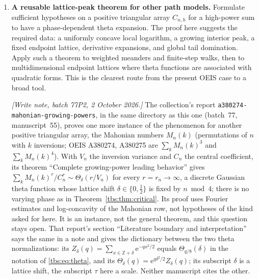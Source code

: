 \documentclass[11pt,a4paper]{article}
\numberwithin{equation}{section}
\theoremstyle{definition}
\newcommand{\Z}{\mathbb Z}
\newcommand{\ee}{\mathrm e}
\newcommand{\code}[1]{\texttt{#1}}
\begin{document}
\begin{enumerate}[leftmargin=*,label=\textbf{Q\arabic*.}]
\item \textbf{A reusable lattice-peak theorem for other path models.}
Formulate sufficient hypotheses on a positive triangular array
$C_{n,h}$ for a high-power sum to have a phase-dependent theta expansion.
The proof here suggests the required data: a uniformly concave local
logarithm, a growing interior peak, a fixed endpoint lattice, derivative
expansions, and global tail domination. Apply such a theorem to weighted
meanders and finite-step walks, then to multidimensional endpoint
lattices where theta functions are associated with quadratic forms.
This is the clearest route from the present OEIS case to a broad tool.

\emph{[Write note, batch 77P2, 2 October 2026.]} The collection's report
\code{a380274-\allowbreak mahonian-\allowbreak growing-\allowbreak powers}, in the same directory as this
one (batch~77, manuscript~55), proves one more instance of the phenomenon
for another positive triangular array, the Mahonian numbers $M_n(k)$
(permutations of $n$ with $k$ inversions; OEIS A380274, A380275 are
$\sum_k M_n(k)^3$ and $\sum_k M_n(k)^4$). With $V_n$ the inversion
variance and $C_n$ the central coefficient, its theorem ``Complete
growing-power leading behavior'' gives
$\sum_k M_n(k)^{r}/C_n^{r}\sim\Theta_\delta(r/V_n)$ for every $r=r_n\to\infty$,
a discrete Gaussian theta function whose lattice shift
$\delta\in\{0,\tfrac12\}$ is fixed by $n\bmod 4$; there is no varying
phase as in Theorem~\ref{tbs:thm:critical}. Its proof uses Fourier
estimates and log-concavity of the Mahonian row, not hypotheses of the
kind asked for here. It is an instance, not the general theorem, and this
question stays open. That report's section ``Literature boundary and
interpretation'' says the same in a note and gives the dictionary between
the two theta normalizations: its $Z_\delta(q)=\sum_{x\in\Z+\delta}\ee^{-qx^2/2}$
equals $\Theta_{q/8}(\delta)$ in the notation of \eqref{tbs:eq:theta}, and its
$\Theta_\delta(q)=\ee^{q\delta^2/2}Z_\delta(q)$; its subscript $\delta$ is a
lattice shift, the subscript $\tau$ here a scale. Neither manuscript cites
the other.


\end{enumerate}
\end{document}
